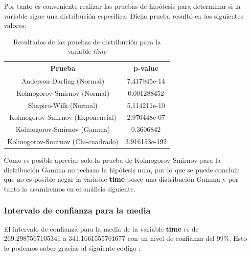 \documentclass[a4paper,12pt]{article}
\begin{document}
Por tanto es conveniente realizar las pruebas de hipótesis para determinar si la variable sigue una distribución específica. Dicha prueba resultó en los siguientes valores:

\begin{table}[h!]
    \centering
    \begin{tabular}{|c|c|}
        \hline
        \textbf{Prueba} & \textbf{p-value} \\
        \hline
        Anderson-Darling (Normal) & 7.417945e-14 \\
        \hline
        Kolmogorov-Smirnov (Normal) & 0.001288452 \\
        \hline
        Shapiro-Wilk (Normal) & 5.114211e-10 \\
        \hline
        Kolmogorov-Smirnov (Exponencial) & 2.970448e-07 \\
        \hline
        Kolmogorov-Smirnov (Gamma) & 0.3606842 \\
        \hline
        Kolmogorov-Smirnov (Chi-cuadrado) & 3.916153e-192 \\
        \hline
    \end{tabular}
    \caption{Resultados de las pruebas de distribución para la variable \textit{time}}
    \label{tab:pruebas_distribucion}
\end{table}

Como es posible apreciar solo la prueba de Kolmogorov-Smirnov para la distribución Gamma no rechaza la hipótesis nula, por lo que se puede concluir que no es posible negar la variable \textbf{time} posee una distribución Gamma y por tanto la asumiremos en el análisis siguiente.

\subsubsection*{Intervalo de confianza para la media}

El intervalo de confianza para la media de la variable \textbf{time} es de 269.2987567105341 a 341.1661555701677 con un nivel de confianza del 99\%. Esto lo podemos saber gracias al siguiente código :
\end{document}
